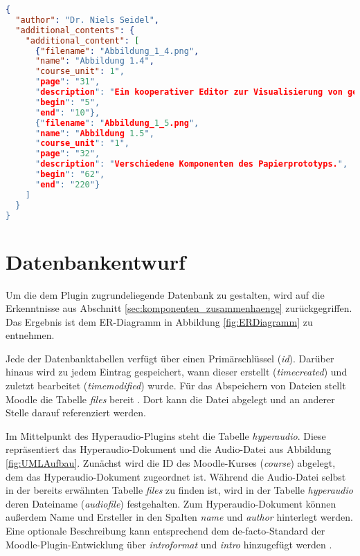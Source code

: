 \begin{lstlisting}[language=json,
             linewidth=\textwidth,
             caption={Beispielhafte Konfigurationsdatei},
             label={lst:JSON}]             
{
  "author": "Dr. Niels Seidel",
  "additional_contents": {
    "additional_content": [
      {"filename": "Abbildung_1_4.png",
      "name": "Abbildung 1.4",
      "course_unit": 1", 
      "page": "31",
      "description": "Ein kooperativer Editor zur Visualisierung von gemeinsam zu lernenden Vokabeln.",
      "begin": "5",
      "end": "10"},
      {"filename": "Abbildung_1_5.png",
      "name": "Abbildung 1.5",
      "course_unit": "1",
      "page": "32",
      "description": "Verschiedene Komponenten des Papierprototyps.",
      "begin": "62",
      "end": "220"}
    ]
  }
}
\end{lstlisting}

\section{Datenbankentwurf}
\label{sec:datenbank}
Um die dem Plugin zugrundeliegende Datenbank zu gestalten, wird auf die Erkenntnisse aus Abschnitt \ref{sec:komponenten_zusammenhaenge} zurückgegriffen. Das Ergebnis ist dem ER-Diagramm in Abbildung \ref{fig:ERDiagramm} zu entnehmen.

Jede der Datenbanktabellen verfügt über einen Primärschlüssel (\textit{id}). Darüber hinaus wird zu jedem Eintrag gespeichert, wann dieser erstellt (\textit{timecreated}) und zuletzt bearbeitet (\textit{timemodified}) wurde. Für das Abspeichern von Dateien stellt Moodle die Tabelle \textit{files} bereit \citep{moodle2018file}. Dort kann die Datei abgelegt und an anderer Stelle darauf referenziert werden.

Im Mittelpunkt des Hyperaudio-Plugins steht die Tabelle \textit{hyperaudio}. Diese repräsentiert das Hyperaudio-Dokument und die Audio-Datei aus Abbildung \ref{fig:UMLAufbau}. Zunächst wird die ID des Moodle-Kurses (\textit{course}) abgelegt, dem das Hyperaudio-Dokument zugeordnet ist. Während die Audio-Datei selbst in der bereits erwähnten Tabelle \textit{files} zu finden ist, wird in der Tabelle \textit{hyperaudio} deren Dateiname (\textit{audiofile}) festgehalten. Zum Hyperaudio-Dokument können außerdem Name und Ersteller in den Spalten \textit{name} und \textit{author} hinterlegt werden. Eine optionale Beschreibung kann entsprechend dem de-facto-Standard der Moodle-Plugin-Entwicklung über \textit{introformat} und \textit{intro} hinzugefügt werden \citep{moodle2016activity}.

